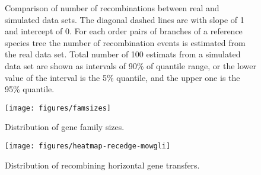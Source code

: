\documentclass[english]{article}
\begin{document}
\begin{figure}

\caption{\label{fig:h2}Comparison of number of recombinations between real
and simulated data sets. The diagonal dashed lines are with
slope of 1 and intercept of 0. For each order pairs of branches of
a reference species tree the number of recombination events is estimated
from the real data set. Total number of 100 estimats from a simulated
data set are shown as intervals of 90\% of quantile range, or the
lower value of the interval is the 5\% quantile, and the upper one
is the 95\% quantile. }
\end{figure}
\clearpage{}%





\begin{figure}
\begin{center}
\texttt{[image: figures/famsizes]}
\end{center}
\vspace{-.3in}
\caption{Distribution of gene family sizes.}
\label{fig:famsize}
\end{figure}

\clearpage


\begin{figure}
\begin{center}
\texttt{[image: figures/heatmap-recedge-mowgli]}
\end{center}
\vspace{-1.2in}
\caption{Distribution of recombining horizontal gene transfers.}
\label{fig:mowgli-recomb-heatmap}
\end{figure}
\clearpage{}
\end{document}
